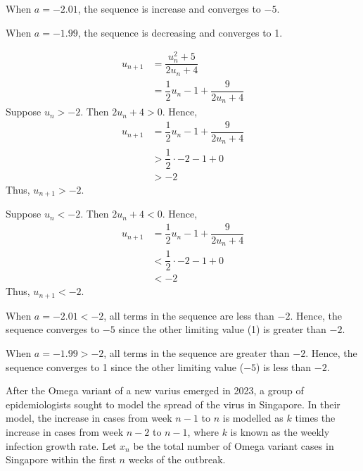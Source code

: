 \documentclass{echw}
\begin{document}
            \subpart

                \noindent When $a = -2.01$, the sequence is increase and converges to $-5$. 
                
                \noindent When $a = -1.99$, the sequence is decreasing and converges to 1.

            \subpart
                \begin{align*}
                    u_{n+1} &= \dfrac{u_n^2 + 5}{2u_n + 4}\\
                    &= \dfrac12 u_n - 1 + \dfrac9{2u_n + 4}
                \end{align*}
                Suppose $u_n > -2$. Then $2u_n + 4 > 0$. Hence,
                \begin{align*}
                    u_{n+1} &= \dfrac12 u_n - 1 + \dfrac9{2u_n + 4}\\
                    &> \dfrac12 \cdot -2 - 1 + 0\\
                    &> -2
                \end{align*}
                Thus, $u_{n+1} > -2$.

                \medskip

                \noindent Suppose $u_n < -2$. Then $2u_n + 4 < 0$. Hence,
                \begin{align*}
                    u_{n+1} &= \dfrac12 u_n - 1 + \dfrac9{2u_n + 4}\\
                    &< \dfrac12 \cdot -2 - 1 + 0\\
                    &< -2
                \end{align*}
                Thus, $u_{n+1} < -2$.

                \medskip

                \noindent When $a = -2.01 < -2$, all terms in the sequence are less than $-2$. Hence, the sequence converges to $-5$ since the other limiting value (1) is greater than $-2$.

                \noindent When $a = -1.99 > -2$, all terms in the sequence are greater than $-2$. Hence, the sequence converges to 1 since the other limiting value ($-5$) is less than $-2$.

    \problem{}
        After the Omega variant of a new varius emerged in 2023, a group of epidemiologists sought to model the spread of the virus in Singapore. In their model, the increase in cases from week $n-1$ to $n$ is modelled as $k$ times the increase in cases from week $n-2$ to $n-1$, where $k$ is known as the weekly infection growth rate. Let $x_n$ be the total number of Omega variant cases in Singapore within the first $n$ weeks of the outbreak.
\end{document}
